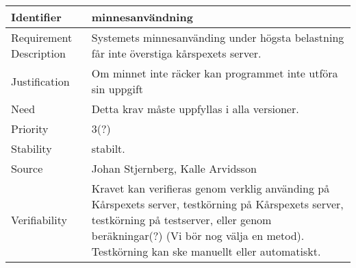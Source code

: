 \documentclass[a4paper, twoside, 11pt, titlepage]{article}
\begin{document}
	\begin{tabular} { | l | l | }
		\hline
		Identifier & minnesanvändning  \\
		\hline
		Requirement Description & Systemets minnesanvänding under högsta belastning får inte överstiga kårspexets server.  \\
		\hline
		Justification & Om minnet inte räcker kan programmet inte utföra sin uppgift  \\
		\hline
		Need & Detta krav måste uppfyllas i alla versioner.  \\
		\hline
		Priority & 3(?)  \\
		\hline
		Stability & stabilt.  \\
		\hline
		Source & Johan Stjernberg, Kalle Arvidsson  \\
		\hline
		Verifiability & Kravet kan verifieras genom verklig använding på Kårspexets server, testkörning på Kårspexets server, testkörning på testserver, eller genom beräkningar(?) (Vi bör nog välja en metod). Testkörning kan ske manuellt eller automatiskt.  \\
		\hline
	\end{tabular}
\end{document}
